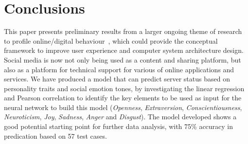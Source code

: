 \documentclass[graybox]{svmult}
\begin{document}
{{{%



\section{Conclusions}\label{conclusions}

This paper presents preliminary results from a larger ongoing theme of
research to profile online/digital
behaviour~\citep{oatley+crick:2014,oatley+crick-gisruk2015,oatley-et-al_dasc2015},
which could provide the conceptual framework to improve user
experience and computer system architecture design. Social media is
now not only being used as a content and sharing platform, but also as
a platform for technical support for various of online applications
and services. We have produced a model that can predict server status
based on personality traits and social emotion tones, by investigating
the linear regression and Pearson correlation to identify the key
elements to be used as input for the neural network to build this
model ({\emph{Openness}}, {\emph{Extraversion}},
{\emph{Conscientiousness}}, {\emph{Neuroticism}}, {\emph{Joy}},
{\emph{Sadness}}, {\emph{Anger}} and {\emph{Disgust}}). The model
developed shows a good potential starting point for further data
analysis, with 75\% accuracy in predication based on 57 test cases.

}}}
\end{document}
